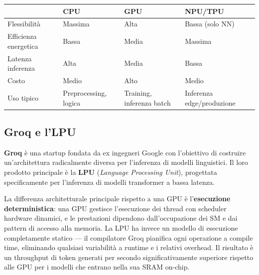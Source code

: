 \documentclass[
  italian,
  openany]{book}
\newcounter{none} %
\begin{document}
{\def\LTcaptype{none} %
\begin{longtable}[]{@{}
  >{\raggedright\arraybackslash}p{}
  >{\raggedright\arraybackslash}p{}
  >{\raggedright\arraybackslash}p{}
  >{\raggedright\arraybackslash}p{}@{}}
\toprule\noalign{}
\begin{minipage}[b]{\linewidth}\raggedright
\end{minipage} & \begin{minipage}[b]{\linewidth}\raggedright
CPU
\end{minipage} & \begin{minipage}[b]{\linewidth}\raggedright
GPU
\end{minipage} & \begin{minipage}[b]{\linewidth}\raggedright
NPU/TPU
\end{minipage} \\
\midrule\noalign{}
\endhead
\bottomrule\noalign{}
\endlastfoot
Flessibilità & Massima & Alta & Bassa (solo NN) \\
Efficienza energetica & Bassa & Media & Massima \\
Latenza inferenza & Alta & Media & Bassa \\
Costo & Medio & Alto & Medio \\
Uso tipico & Preprocessing, logica & Training, inferenza batch &
Inferenza edge/produzione \\
\end{longtable}
}

\subsection{Groq e l'LPU}\label{groq-e-llpu}

\textbf{Groq} è una startup fondata da ex ingegneri Google con
l'obiettivo di costruire un'architettura radicalmente diversa per
l'inferenza di modelli linguistici. Il loro prodotto principale è la
\textbf{LPU} (\emph{Language Processing Unit}), progettata
specificamente per l'inferenza di modelli transformer a bassa latenza.

La differenza architetturale principale rispetto a una GPU è
l'\textbf{esecuzione deterministica}: una GPU gestisce l'esecuzione dei
thread con scheduler hardware dinamici, e le prestazioni dipendono
dall'occupazione dei SM e dai pattern di accesso alla memoria. La LPU ha
invece un modello di esecuzione completamente statico --- il compilatore
Groq pianifica ogni operazione a compile time, eliminando qualsiasi
variabilità a runtime e i relativi overhead. Il risultato è un
throughput di token generati per secondo significativamente superiore
rispetto alle GPU per i modelli che entrano nella sua SRAM on-chip.
\end{document}
